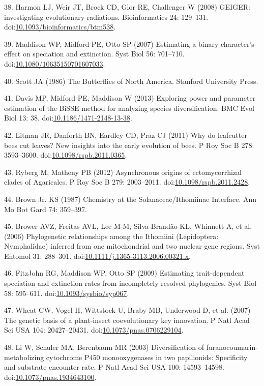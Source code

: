 \documentclass[10pt]{article}
\begin{document}
38. Harmon LJ, Weir JT, Brock CD, Glor RE, Challenger W (2008) GEIGER:
investigating evolutionary radiations. Bioinformatics 24: 129--131.
doi:\href{http://dx.doi.org/10.1093/bioinformatics/btm538}{10.1093/bioinformatics/btm538}.

39. Maddison WP, Midford PE, Otto SP (2007) Estimating a binary
character's effect on speciation and extinction. Syst Biol 56: 701--710.
doi:\href{http://dx.doi.org/10.1080/10635150701607033}{10.1080/10635150701607033}.

40. Scott JA (1986) The Butterflies of North America. Stanford
University Press.

41. Davis MP, Midford PE, Maddison W (2013) Exploring power and
parameter estimation of the BiSSE method for analyzing species
diversification. BMC Evol Biol 13: 38.
doi:\href{http://dx.doi.org/10.1186/1471-2148-13-38}{10.1186/1471-2148-13-38}.

42. Litman JR, Danforth BN, Eardley CD, Praz CJ (2011) Why do leafcutter
bees cut leaves? New insights into the early evolution of bees. P Roy
Soc B 278: 3593--3600.
doi:\href{http://dx.doi.org/10.1098/rspb.2011.0365}{10.1098/rspb.2011.0365}.

43. Ryberg M, Matheny PB (2012) Asynchronous origins of ectomycorrhizal
clades of Agaricales. P Roy Soc B 279: 2003--2011.
doi:\href{http://dx.doi.org/10.1098/rspb.2011.2428}{10.1098/rspb.2011.2428}.

44. Brown Jr. KS (1987) Chemistry at the Solanaceae/Ithomiinae
Interface. Ann Mo Bot Gard 74: 359--397.

45. Brower AVZ, Freitas AVL, Lee M-M, Silva-Brandão KL, Whinnett A, et
al. (2006) Phylogenetic relationships among the Ithomiini (Lepidoptera:
Nymphalidae) inferred from one mitochondrial and two nuclear gene
regions. Syst Entomol 31: 288--301.
doi:\href{http://dx.doi.org/10.1111/j.1365-3113.2006.00321.x}{10.1111/j.1365-3113.2006.00321.x}.

46. {FitzJohn} RG, Maddison WP, Otto SP (2009) Estimating
trait-dependent speciation and extinction rates from incompletely
resolved phylogenies. Syst Biol 58: 595--611.
doi:\href{http://dx.doi.org/10.1093/sysbio/syp067}{10.1093/sysbio/syp067}.

47. Wheat CW, Vogel H, Wittstock U, Braby MB, Underwood D, et al. (2007)
The genetic basis of a plant-insect coevolutionary key innovation. P
Natl Acad Sci USA 104: 20427--20431.
doi:\href{http://dx.doi.org/10.1073/pnas.0706229104}{10.1073/pnas.0706229104}.

48. Li W, Schuler MA, Berenbaum MR (2003) Diversification of
furanocoumarin-metabolizing cytochrome P450 monooxygenases in two
papilionids: Specificity and substrate encounter rate. P Natl Acad Sci
USA 100: 14593--14598.
doi:\href{http://dx.doi.org/10.1073/pnas.1934643100}{10.1073/pnas.1934643100}.
\end{document}
